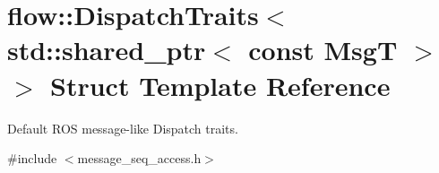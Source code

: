 \hypertarget{structflow_1_1_dispatch_traits_3_01std_1_1shared__ptr_3_01const_01_msg_t_01_4_01_4}{}\section{flow\+:\+:Dispatch\+Traits$<$ std\+:\+:shared\+\_\+ptr$<$ const MsgT $>$ $>$ Struct Template Reference}
\label{structflow_1_1_dispatch_traits_3_01std_1_1shared__ptr_3_01const_01_msg_t_01_4_01_4}


Default R\+OS message-\/like Dispatch traits.  




{\ttfamily \#include $<$message\+\_\+seq\+\_\+access.\+h$>$}

